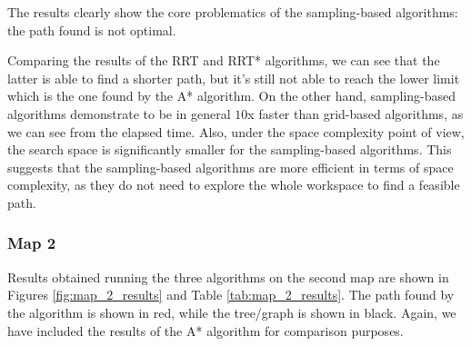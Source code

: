 The results clearly show the core problematics of the sampling-based algorithms: the path found is not optimal.

Comparing the results of the RRT and RRT* algorithms, we can see that the latter is able to find a shorter path, but it's still not able to reach the lower limit which is the one found by the A* algorithm.
On the other hand, sampling-based algorithms demonstrate to be in general $10$x faster than grid-based algorithms, as we can see from the elapsed time.
Also, under the space complexity point of view, the search space is significantly smaller for the sampling-based algorithms.
This suggests that the sampling-based algorithms are more efficient in terms of space complexity, as they do not need to explore the whole workspace to find a feasible path.


\subsubsection{Map 2}
\label{subsec:map_2}

Results obtained running the three algorithms on the second map are shown in Figures \ref{fig:map_2_results} and Table \ref{tab:map_2_results}.
The path found by the algorithm is shown in red, while the tree/graph is shown in black.
Again, we have included the results of the A* algorithm for comparison purposes.


